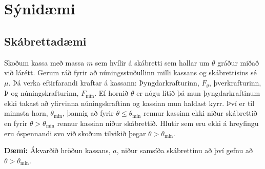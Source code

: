 \section{Sýnidæmi}

\subsection*{Skábrettadæmi}

Skoðum kassa með massa $m$ sem hvílir á skábretti sem hallar um $\theta$ gráður miðað við lárétt. Gerum ráð fyrir að núningsstuðullinn milli kassans og skábrettisins sé $\mu$. Þá verka eftirfarandi kraftar á kassann: Þyngdarkrafturinn, $F_g$, þverkrafturinn, $\text{Þ}$ og núningskrafturinn, $F_{\text{nún}}$. Ef hornið $\theta$ er nógu lítið þá mun þyngdarkraftinum ekki takast að yfirvinna núningskraftinn og kassinn mun haldast kyrr. Því er til minnsta horn, $\theta_{\text{min}}$, þannig að fyrir $\theta \leq \theta_{\text{min}}$ rennur kassinn ekki niður skábrettið en fyrir $\theta > \theta_{\text{min}}$ rennur kassinn niður skábrettið. Hlutir sem eru ekki á hreyfingu eru óspennandi svo við skoðum tilvikið þegar $\theta > \theta_{\text{min}}$.



\textbf{Dæmi:} Ákvarðið hröðun kassans, $a$, niður samsíða skábrettinu að því gefnu að $\theta > \theta_{\text{min}}$. \\

